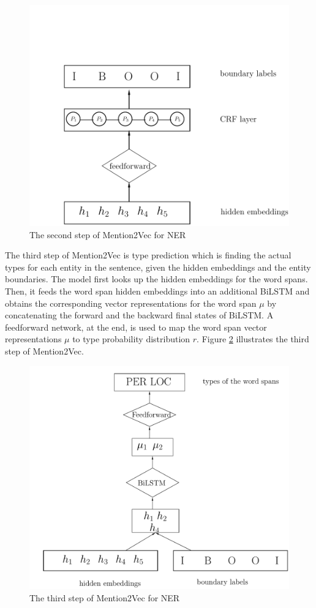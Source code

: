 \documentclass{sfuthesis}
\begin{document}
\begin{figure}
  \centering
  \includegraphics[scale=0.6]{mention2vec2.pdf}
 \caption{The second step of Mention2Vec for NER}
  \label{fig:mention2vec2}
\end{figure}

The third step of Mention2Vec is type prediction which is finding the actual types for each entity in the sentence, given the hidden embeddings and the entity boundaries. The model first looks up the hidden embeddings for the word spans. Then, it feeds the word span hidden embeddings into an additional BiLSTM and obtains the corresponding vector representations for the word span $\mu$ by concatenating the forward and the backward final states of BiLSTM. A feedforward network, at the end, is used to map the word span vector representations $\mu$ to type probability distribution $r$. Figure \ref{fig:mention2vec3} illustrates the third step of Mention2Vec.

\begin{figure}
  \centering
  \includegraphics[scale=0.6]{mention2vec3.pdf}
 \caption{The third step of Mention2Vec for NER}
  \label{fig:mention2vec3}
\end{figure}
\end{document}
